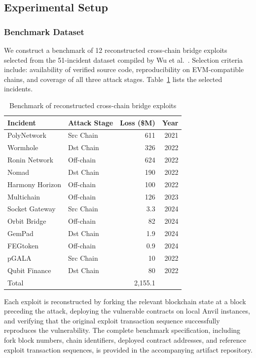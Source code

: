\documentclass[journal]{IEEEtran}
\begin{document}
\subsection{Experimental Setup}

\subsubsection{Benchmark Dataset}

We construct a benchmark of 12 reconstructed cross-chain bridge exploits selected from the 51-incident dataset compiled by Wu et al.~\cite{wu2025safeguarding}. Selection criteria include: availability of verified source code, reproducibility on EVM-compatible chains, and coverage of all three attack stages. Table~\ref{tab:benchmark} lists the selected incidents.

\begin{table}[t]
\centering
\caption{Benchmark of reconstructed cross-chain bridge exploits}
\label{tab:benchmark}
\begin{tabular}{@{}llrr@{}}
\toprule
Incident & Attack Stage & Loss (\$M) & Year \\
\midrule
PolyNetwork      & Src Chain    & 611 & 2021 \\
Wormhole          & Dst Chain    & 326 & 2022 \\
Ronin Network     & Off-chain    & 624 & 2022 \\
Nomad             & Dst Chain    & 190 & 2022 \\
Harmony Horizon   & Off-chain    & 100 & 2022 \\
Multichain        & Off-chain    & 126 & 2023 \\
Socket Gateway    & Src Chain    &  3.3 & 2024 \\
Orbit Bridge      & Off-chain    &  82 & 2024 \\
GemPad            & Dst Chain    &  1.9 & 2024 \\
FEGtoken          & Off-chain    &  0.9 & 2024 \\
pGALA             & Src Chain    &  10 & 2022 \\
Qubit Finance     & Dst Chain    &  80 & 2022 \\
\midrule
\multicolumn{2}{l}{Total} & 2{,}155.1 & \\
\bottomrule
\end{tabular}
\end{table}

Each exploit is reconstructed by forking the relevant blockchain state at a block preceding the attack, deploying the vulnerable contracts on local Anvil instances, and verifying that the original exploit transaction sequence successfully reproduces the vulnerability. The complete benchmark specification, including fork block numbers, chain identifiers, deployed contract addresses, and reference exploit transaction sequences, is provided in the accompanying artifact repository.
\end{document}
